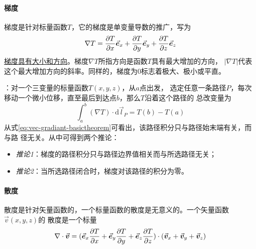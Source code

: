 \paragraph*{梯度}
梯度是针对标量函数$T$，它的梯度是单变量导数的推广，写为
\begin{equation}
    \nabla T =   \frac{\partial T}{\partial x}\vec{\bm{e}}_x 
               + \frac{\partial T}{\partial y}\vec{\bm{e}}_y
               + \frac{\partial T}{\partial z}\vec{\bm{e}}_z
    \label{eq:vec-gradient}
\end{equation}
\uline{梯度具有大小和方向}。梯度$\nabla T$所指方向是函数$T$具有最大增加的方向，
$|\nabla T|$代表这个最大增加方向的斜率。同样的，梯度为$0$标志着极大、极小或平直。

：对一个三变量的标量函数$T(x, y, z)$，从$a$点出发，
选定任意一条路径$P$，每次移动一个微小位移，直至最后到达点$b$，那么$T$沿着这个路径的
总改变量为
\begin{equation}
    \int_{a}^{b} (\nabla T) \cdot \mathrm{d} \vec{l}_{P} = T(b) - T(a)
    \label{eq:vec-gradiant-basictheorem}
\end{equation}
从式\eqref{eq:vec-gradiant-basictheorem}可看出，该路径积分只与路径始末端有关，而与路
径无关。从中可得到两个推论：
\begin{itemize}
    \item \textit{推论1}：梯度的路径积分只与路径边界值相关而与所选路径无关；
    \item \textit{推论2}：当所选路径闭合时，梯度对该路径的积分为零。
\end{itemize}

\paragraph*{散度}
散度是针对矢量函数的，一个标量函数的散度是无意义的。一个矢量函数$\vec{v}(x, y, z)$的
散度是一个标量
\begin{equation}
    \nabla \cdot \vec{\bm{v}} = (   \vec{\bm{e}}_x \frac{\partial T}{\partial x} 
                             + \vec{\bm{e}}_y \frac{\partial T}{\partial y}
                             + \vec{\bm{e}}_z \frac{\partial T}{\partial z})
                           \cdot
                           (\vec{\bm{v}}_x + \vec{\bm{v}}_y + \vec{\bm{v}}_z)
    \label{eq:vec-devergence}
\end{equation}

